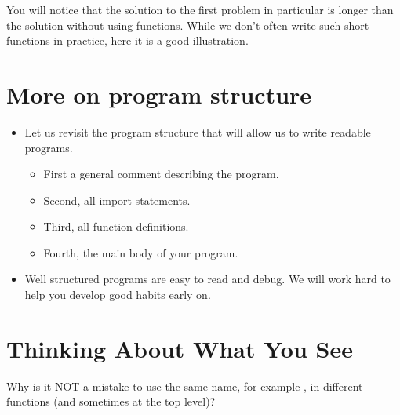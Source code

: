 \documentclass[letterpaper,10pt,english]{sphinxmanual}
\begin{document}
You will notice that the solution to the first problem in particular
is longer than the solution without using functions.  While we don’t
often write such short functions in practice, here it is a good
illustration.


\section{More on program structure}
\label{\detokenize{lecture_notes/lec05_functions2:more-on-program-structure}}\begin{itemize}
\item {} 
Let us revisit the program structure that will allow us to write
readable programs.
\begin{itemize}
\item {} 
First a general comment describing the program.

\item {} 
Second, all import statements.

\item {} 
Third, all function definitions.

\item {} 
Fourth, the main body of your program.

\end{itemize}

\item {} 
Well structured programs are easy to read and debug. We will work
hard to help you develop good habits early on.

\end{itemize}


\section{Thinking About What You See}
\label{\detokenize{lecture_notes/lec05_functions2:thinking-about-what-you-see}}
Why is it NOT a mistake to use the same name, for example , in
different functions (and sometimes at the top level)?
\end{document}
